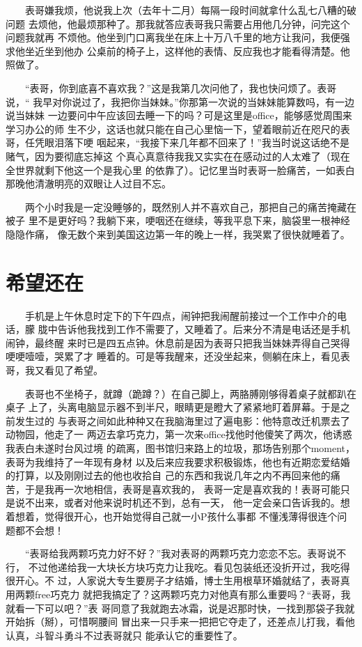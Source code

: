 \documentclass[12pt]{book}
\begin{document}
　　表哥嫌我烦，他说我上次（去年十二月）每隔一段时间就拿什么乱七八糟的破问题
去烦他，他最烦那种了。那我就答应表哥我只需要占用他几分钟，问完这个问题我就再
不烦他。他坐到门口离我坐在床上十万八千里的地方让我问，我便强求他坐近坐到他办
公桌前的椅子上，这样他的表情、反应我也才能看得清楚。他照做了。

　　“表哥，你到底喜不喜欢我？”这是我第几次问他了，我也快问烦了。表哥说，“
我早对你说过了，我把你当妹妹。”你那第一次说的当妹妹能算数吗，有一边说当妹妹
一边要问中午应该回去睡一下的吗？可是这里是office，能够感觉周围来学习办公的师
生不少，这话也就只能在自己心里恼一下，望着眼前近在咫尺的表哥，任凭眼泪落下哽
咽起来，“我接下来几年都不回来了！”我当时说这话绝不是赌气，因为要彻底忘掉这
个真心真意待我我又实实在在感动过的人太难了（现在全世界就剩下他这一个是我心里
的依靠了）。记忆里当时表哥一脸痛苦，一如表白那晚他清澈明亮的双眼让人过目不忘。

　　两个小时我是一定没睡够的，既然别人并不喜欢自己，那把自己的痛苦掩藏在被子
里不是更好吗？我躺下来，哽咽还在继续，等我平息下来，脑袋里一根神经隐隐作痛，
像无数个来到美国这边第一年的晚上一样，我哭累了很快就睡着了。
\section{希望还在}
\label{sec-8-10}

　　手机是上午休息时定下的下午四点，闹钟把我闹醒前接过一个工作中介的电话，朦
胧中告诉他我找到工作不需要了，又睡着了。后来分不清是电话还是手机闹钟，最终醒
来时已是四五点钟。休息前是因为表哥只把我当妹妹弄得自己哭得哽哽噎噎，哭累了才
睡着的。可是等我醒来，还没坐起来，侧躺在床上，看见表哥，我又看见了希望。

　　表哥也不坐椅子，就蹲（跪蹲？）在自己脚上，两胳膊刚够得着桌子就都趴在桌子
上了，头离电脑显示器不到半尺，眼睛更是瞪大了紧紧地盯着屏幕。于是之前发生过的
与表哥之间如此种种又在我脑海里过了遍电影：他特意改迁机票去了动物园，他走了一
两迈去拿巧克力，第一次来office找他时他傻笑了两次，他诱惑我表白未遂时台风过境
的疏离，图书馆归来路上的垃圾，那场告别那个moment，表哥为我维持了一年现有身材
以及后来应我要求积极锻炼，他也有近期恋爱结婚的打算，以及刚刚过去的他也收拾自
己的东西和我说几年之内不再回来他的痛苦，于是我再一次地相信，表哥是喜欢我的，
表哥一定是喜欢我的！表哥可能只是说不出来，或者对他来说时机还不到，总有一天，
他一定会亲口告诉我的。想着想着，觉得很开心，也开始觉得自己就一小P孩什么事都
不懂浅薄得很连个问题都不会想！

　　“表哥给我两颗巧克力好不好？”我对表哥的两颗巧克力恋恋不忘。表哥说不行，
不过他递给我一大块长方块巧克力让我吃。看见包装纸还没折开过，我吃得很开心。不
过，人家说大专生要房子才结婚，博士生用根草环婚就结了，表哥真用两颗free巧克力
就把我搞定了？这两颗巧克力对他真有那么重要吗？“表哥，我就看一下可以吧？”表
哥同意了我就跑去冰霜，说是迟那时快，一找到那袋子我就开始拆（掰），可惜啊腰间
冒出来一只手来一把把它夺走了，还差点儿打我，看他认真，斗智斗勇斗不过表哥就只
能承认它的重要性了。
\end{document}
